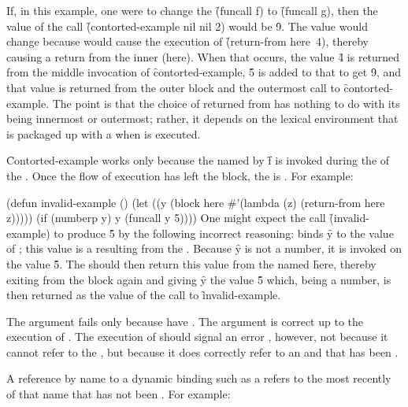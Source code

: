If, in this example, one were to change the \f{(funcall f)} to
\f{(funcall g)}, then the value of the call \f{(contorted-example nil nil 2)}
would be \f{9}.  The value would change because 
 would cause the
execution of \f{(return-from here\ssst\ 4)}, thereby causing
a return from the inner  (here\ssst).
When that occurs, the value \f{4} is returned from the
middle invocation of \f{contorted-example}, \f{5} is added to that
to get \f{9}, and that value is returned from the outer block
and the outermost call to \f{contorted-example}.  The point
is that the choice of 
returned from has nothing to do with its
being innermost or outermost; rather,
it depends on the lexical environment
that is packaged up with a  when
 is executed.
                                  
\endSubsection%

\f{Contorted-example} works only because the
 named by \f{f} is invoked during the  of the 
.
Once the flow of execution has left the block,
the  is .  For example:

\code
 (defun invalid-example ()
   (let ((y (block here #'(lambda (z) (return-from here z)))))
     (if (numberp y) y (funcall y 5))))
\endcode
One might expect the call \f{(invalid-example)} to produce \f{5}
by the following incorrect reasoning:
 binds \f{y} to the
value of ; this value is a  resulting
from the .  Because \f{y} is not a number, it is
invoked on the value \f{5}.  The  should then
return this value from the                      
 named \f{here}, thereby
exiting from the block again and giving \f{y} the value \f{5}
which, being a number, is then returned as the value of the call
to \f{invalid-example}.

The argument fails only because  have 
.  The argument is correct up to the execution of
.  The execution of 
should signal an error , however, not
because it cannot refer to the , but because it
does correctly refer to an  and that 
 has been .

A reference by name to a dynamic  binding such as
a  refers to the most recently 
  of that name that has not been 
.  For example:

